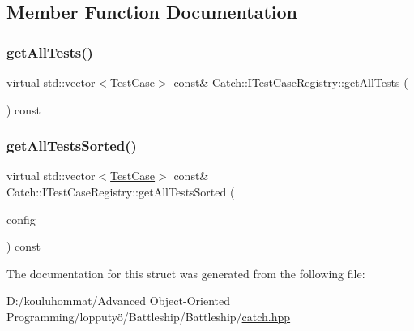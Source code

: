 \subsection{Member Function Documentation}
\mbox{\label{struct_catch_1_1_i_test_case_registry_ad6e4d4a621655123f73ae98cfeda063d}} 
\subsubsection{\texorpdfstring{get\+All\+Tests()}{getAllTests()}}
{\footnotesize\ttfamily virtual std\+::vector$<$\mbox{\hyperlink{class_catch_1_1_test_case}{Test\+Case}}$>$ const\& Catch\+::\+I\+Test\+Case\+Registry\+::get\+All\+Tests (\begin{DoxyParamCaption}{ }\end{DoxyParamCaption}) const\hspace{0.3cm}{\ttfamily [pure virtual]}}

\mbox{\label{struct_catch_1_1_i_test_case_registry_a33e46639d0319d35497c05bb5d02be5a}} 
\subsubsection{\texorpdfstring{get\+All\+Tests\+Sorted()}{getAllTestsSorted()}}
{\footnotesize\ttfamily virtual std\+::vector$<$\mbox{\hyperlink{class_catch_1_1_test_case}{Test\+Case}}$>$ const\& Catch\+::\+I\+Test\+Case\+Registry\+::get\+All\+Tests\+Sorted (\begin{DoxyParamCaption}\item[{I\+Config const \&}]{config }\end{DoxyParamCaption}) const\hspace{0.3cm}{\ttfamily [pure virtual]}}



The documentation for this struct was generated from the following file\+:\begin{DoxyCompactItemize}
\item 
D\+:/kouluhommat/\+Advanced Object-\/\+Oriented Programming/lopputyö/\+Battleship/\+Battleship/\mbox{\hyperlink{catch_8hpp}{catch.\+hpp}}\end{DoxyCompactItemize}

